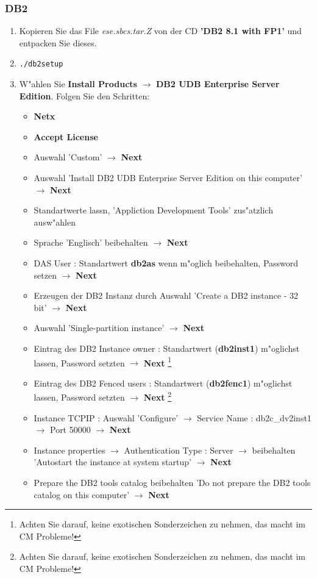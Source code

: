 \subsubsection{DB2}
\begin{enumerate}
\item Kopieren Sie das File {\it ese.sbcs.tar.Z} von der CD {\bf 'DB2 8.1 with FP1'} und entpacken Sie dieses.
\item {\tt ./db2setup}
\item W"ahlen Sie {\bf Install Products} $\rightarrow$ {\bf DB2 UDB Enterprise Server Edition}. Folgen Sie den Schritten:
\begin{itemize}
\item {\bf Netx}
\item {\bf Accept License}
\item Auswahl 'Custom' $\rightarrow$ {\bf Next}
\item Auswahl 'Install DB2 UDB Enterprise Server Edition on this computer' $\rightarrow$ {\bf Next}
\item Standartwerte lassn, 'Appliction Development Tools' zus"atzlich ausw"ahlen
\item Sprache 'Englisch' beibehalten $\rightarrow$ {\bf Next}
\item DAS User : Standartwert {\bf db2as} wenn m"oglich beibehalten, Password setzen $\rightarrow$ {\bf Next}
\item Erzeugen der DB2 Instanz durch Auswahl 'Create a DB2 instance - 32 bit' $\rightarrow$ {\bf Next}
\item Auswahl 'Single-partition instance' $\rightarrow$ {\bf Next}
\item Eintrag des DB2 Instance owner : Standartwert ({\bf db2inst1}) m"oglichst lassen, Password setzten $\rightarrow$ {\bf Next} \footnote{Achten Sie darauf, keine exotischen Sonderzeichen zu nehmen, das macht im CM Probleme!}
\item Eintrag des DB2 Fenced users : Standartwert ({\bf db2fenc1}) m"oglichst lassen, Password setzten $\rightarrow$ {\bf Next} \footnote{Achten Sie darauf, keine exotischen Sonderzeichen zu nehmen, das macht im CM Probleme!}
\item Instance TCPIP : Auswahl 'Configure' $\rightarrow$ Service Name : db2c\_dv2inst1 $\rightarrow$ Port 50000 $\rightarrow$ {\bf Next}
\item Instance properties $\rightarrow$ Authentication Type : Server $\rightarrow$ beibehalten 'Autostart the instance at system startup' $\rightarrow$ {\bf Next}
\item Prepare the DB2 tools catalog  beibehalten 'Do not prepare the DB2 tools catalog on this computer' $\rightarrow$ {\bf Next}

\end{itemize}
\end{enumerate}
